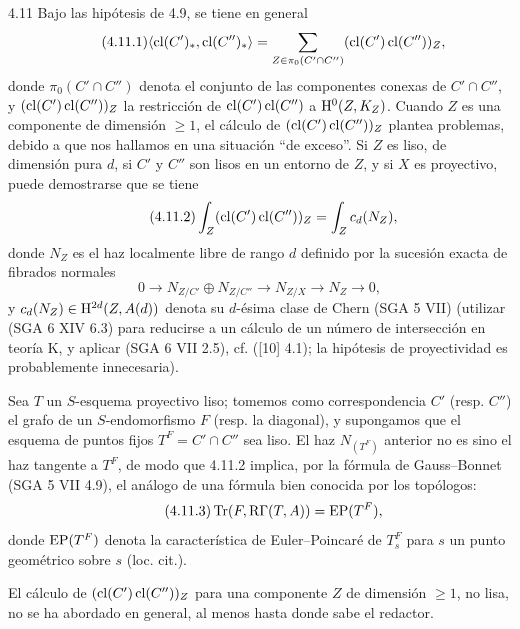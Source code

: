 \begin{statement}{4.11}
Bajo las hipótesis de 4.9, se tiene en general
\begin{equation}
\tag{4.11.1}
\langle \operatorname{cl}(C')_*,\operatorname{cl}(C'')_*\rangle
=
\sum_{Z\in\pi_0(C'\cap C'')}(\operatorname{cl}(C')\operatorname{cl}(C''))_Z,
\end{equation}
donde $\pi_0(C'\cap C'')$ denota el conjunto de las componentes conexas de $C'\cap C''$, y $(\operatorname{cl}(C')\operatorname{cl}(C''))_Z$ la restricción de $\operatorname{cl}(C')\operatorname{cl}(C'')$ a $\mathrm{H}^0(Z,K_Z)$. Cuando $Z$ es una componente de dimensión $\geq 1$, el cálculo de $(\operatorname{cl}(C')\operatorname{cl}(C''))_Z$ plantea problemas, debido a que nos hallamos en una situación ``de exceso''. Si $Z$ es liso, de dimensión pura $d$, si $C'$ y $C''$ son lisos en un entorno de $Z$, y si $X$ es proyectivo, puede demostrarse que se tiene
\begin{equation}
\tag{4.11.2}
\int_Z(\operatorname{cl}(C')\operatorname{cl}(C''))_Z=\int_Z c_d(N_Z),
\end{equation}
donde $N_Z$ es el haz localmente libre de rango $d$ definido por la sucesión exacta de fibrados normales
\[
0\longrightarrow N_{Z/C'}\oplus N_{Z/C''}\longrightarrow N_{Z/X}\longrightarrow N_Z\longrightarrow 0,
\]
y $c_d(N_Z)\in \mathrm{H}^{2d}(Z,A(d))$ denota su $d$-ésima clase de Chern (SGA 5 VII) (utilizar (SGA 6 XIV 6.3) para reducirse a un cálculo de un número de intersección en teoría K, y aplicar (SGA 6 VII 2.5), cf. ([10] 4.1); la hipótesis de proyectividad es probablemente innecesaria).

Sea $T$ un $S$-esquema proyectivo liso; tomemos como correspondencia $C'$ (resp. $C''$) el grafo de un $S$-endomorfismo $F$ (resp. la diagonal), y supongamos que el esquema de puntos fijos $T^F=C'\cap C''$ sea liso. El haz $N_{(T^F)}$ anterior no es sino el haz tangente a $T^F$, de modo que 4.11.2 implica, por la fórmula de Gauss--Bonnet (SGA 5 VII 4.9), el análogo de una fórmula bien conocida por los topólogos:
\begin{equation}
\tag{4.11.3}
\operatorname{Tr}(F,\mathrm{R}\Gamma(T,A))=\operatorname{EP}(T^F),
\end{equation}
donde $\operatorname{EP}(T^F)$ denota la característica de Euler--Poincaré de $T_s^F$ para $s$ un punto geométrico sobre $s$ (loc. cit.).
\end{statement}

El cálculo de $(\operatorname{cl}(C')\operatorname{cl}(C''))_Z$ para una componente $Z$ de dimensión $\geq 1$, no lisa, no se ha abordado en general, al menos hasta donde sabe el redactor.

